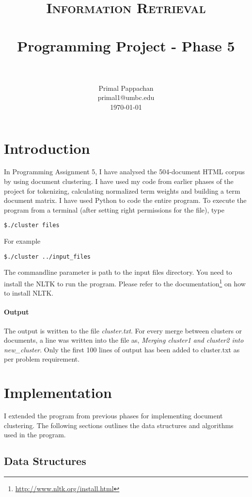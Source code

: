 \documentclass[paper=a4, fontsize=11pt]{scrartcl}
\title{
		\usefont{OT1}{bch}{b}{n}
		\normalfont \normalsize \textsc{Information Retrieval} \\ [25pt]
		\horrule{0.5pt} \\[0.4cm]
		\huge Programming Project - Phase 5 \\
		\horrule{2pt} \\[0.5cm]
}
\author{
		\normalfont 								\normalsize
        Primal Pappachan\\[-3pt]		\normalsize
        primal1@umbc.edu\\[-3pt]		\normalsize
        \today
}
\date{}
\numberwithin{equation}{section}		%
\numberwithin{figure}{section}			%
\numberwithin{table}{section}				%
\begin{document}
\maketitle
\section{Introduction}
In Programming Assignment 5, I have analysed the 504-document HTML corpus by using document clustering. I have used my code from earlier phases of the project for tokenizing, calculating normalized term weights and building a term document matrix. I have used Python to code the entire program. To execute the program from a terminal (after setting right permissions for the file), type 

\begin{verbatim}
$./cluster files 
\end{verbatim}

For example
\begin{verbatim}
$./cluster ../input_files 
\end{verbatim}

The commandline parameter is path to the input files directory. You need to install the NLTK to run the program. Please refer to the documentation\footnote{\url{http://www.nltk.org/install.html}} on how to install NLTK.

\paragraph{Output}

The output is written to the file \textit{cluster.txt}. For every merge between clusters or documents, a line was written into the file as, \textit{Merging cluster1 and cluster2 into new_cluster}. Only the first 100 lines of output has been added to cluster.txt as per problem requirement.

\section{Implementation}

I extended the program from previous phases for implementing document clustering. The following sections outlines the data structures and algorithms used in the program.

\subsection{Data Structures}
\end{document}
